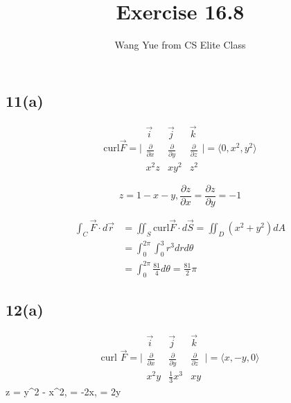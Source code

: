 \documentclass{article}
\begin{document}
  \title{Exercise 16.8}
  \author{Wang Yue from CS Elite Class}
  \maketitle

  \subsection*{11(a)}

  $$\textrm{curl} \overrightarrow{F} = \biggl|\begin{matrix}
    \overrightarrow{i} & \overrightarrow{j} & \overrightarrow{k} \\
    \frac{\partial }{\partial x} & \frac{\partial }{\partial y} & \frac{\partial }{\partial z} \\
    x^2z & xy^2 & z^2
  \end{matrix}\biggl| = \langle 0, x^2, y^2 \rangle
  $$

  $$z = 1 - x - y, \frac{\partial z}{\partial x} = \frac{\partial z}{\partial y} = -1$$

  $$\begin{aligned}
    \int_C \overrightarrow{F} \cdot d\overrightarrow{r} &= \iint_S \textrm{curl} \overrightarrow{F} \cdot d\overrightarrow{S} = \iint_D (x^2 + y^2) dA \\
                                                        &= \int_0^{2\pi} \int_0^3 r^3 dr d\theta \\
                                                        &= \int_0^{2\pi} \frac{81}{4} d\theta = \frac{81}{2} \pi
  \end{aligned}
  $$

  \subsection*{12(a)}

  $$\textrm{curl } \overrightarrow{F} = \biggl|\begin{matrix}
    \overrightarrow{i} & \overrightarrow{j} & \overrightarrow{k} \\
    \frac{\partial }{\partial x} & \frac{\partial }{\partial y} & \frac{\partial }{\partial z} \\
    x^2y & \frac{1}{3}x^3 & xy
  \end{matrix}\biggl| = \langle x, -y, 0 \rangle

  $$z = y^2 - x^2,  = -2x,  = 2y$$
\end{document}
